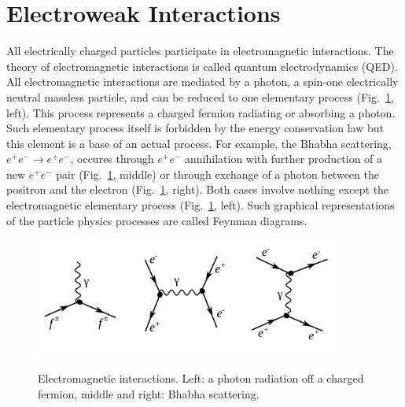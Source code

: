 \section{Electroweak Interactions}
\label{sec:Intro_Electroweak}

All electrically charged particles participate in electromagnetic interactions. The theory of electromagnetic interactions is called quantum electrodynamics (QED). All electromagnetic interactions are mediated by a photon, a spin-one electrically neutral massless particle, and can be reduced to one elementary process (Fig.~\ref{fig:feynmEM}, left). This process represents a charged fermion radiating or absorbing a photon. Such elementary process itself is forbidden by the energy conservation law but this element is a base of an actual process. For example, the Bhabha scattering, $e^+e^- \rightarrow e^+e^-$, occures through $e^+e^-$ annihilation with further production of a new $e^+e^-$ pair (Fig.~\ref{fig:feynmEM}, middle) or through exchange of a photon between the positron and the electron (Fig.~\ref{fig:feynmEM}, right). Both cases involve nothing except the electromagnetic elementary process (Fig.~\ref{fig:feynmEM}, left). Such graphical representations of the particle physics processes are called Feynman diagrams.\\ 

\begin{figure}[htb]
  \begin{center}
    {\includegraphics[width=0.90\textwidth]{../figs/Intro/feynmEM.png}}
    \caption{Electromagnetic interactions. Left: a photon radiation off a charged fermion, middle and right: Bhabha scattering. }
    \label{fig:feynmEM}
  \end{center}
\end{figure}

